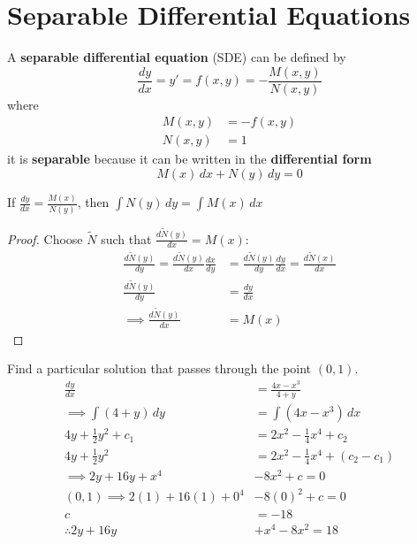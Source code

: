 \documentclass[diffeq.tex]{subfiles}
\begin{document}
    \section{Separable Differential Equations}
    \begin{definition}
        A \textbf{separable differential equation} (SDE) can be defined by
        \begin{equation}
            \frac{dy}{dx}=y'=f(x, y)=-\frac{M(x, y)}{N(x, y)}
        \end{equation}
        where
        \begin{align}
            M(x, y) &= - f(x, y)\\
            N(x, y) &= 1
        \end{align}
        it is \textbf{separable} because it can be written in the \textbf{differential form}
        \begin{equation}
            M(x)\,dx+N(y)\,dy=0
        \end{equation}
    \end{definition}
    \begin{theorem}
        If $\frac{dy}{dx} = \frac{M(x)}{N(y)}$, then $\int N(y)\,dy=\int M(x)\,dx$
    \end{theorem}
    \begin{proof}
        Choose $\widetilde{N}$ such that $\frac{d\widetilde{N}(y)}{dx} = M(x)$:
    \begin{align}
        \frac{d\widetilde{N}(y)}{dy} = \frac{d\widetilde{N}(y)}{dx}\frac{dx}{dy} &= \frac{d\widetilde{N}(y)}{dy}\frac{dy}{dx}= \frac{d\widetilde{N}(x)}{dx}\\
        \frac{d\widetilde{N}(y)}{dy} &= \frac{dy}{dx}
        \\
        \implies \frac{d\widetilde{N}(y)}{dx} &= M(x)
    \end{align}
    \end{proof}
    \np
    \begin{example}
        Find a particular solution that passes through the point $(0, 1)$.
        \begin{align}
            \frac{dy}{dx} &= \frac{4x-x^{3}}{4 + y}\\
            \implies \int (4 + y)\,dy &= \int(4x-x^{3})\,dx\\
            4y+\frac{1}{2}y^{2} + c_1 &= 2 x^{2}-\frac{1}{4}x^{4} + c_2\\
            4y + \frac{1}{2} y^{2} &= 2 x^{2} - \frac{1}{4} x^{4} + (c_2 - c_1)\\
            \implies 2y + 16y + x^{4} &- 8x^{2} + c = 0\\
            (0, 1) \implies 2(1) + 16(1) + 0^{4} &- 8(0)^{2} + c = 0\\
            c &= -18\\
            \therefore 2y + 16y &+ x^{4} - 8x^{2} = 18
        \end{align}
    \end{example}
\end{document}
